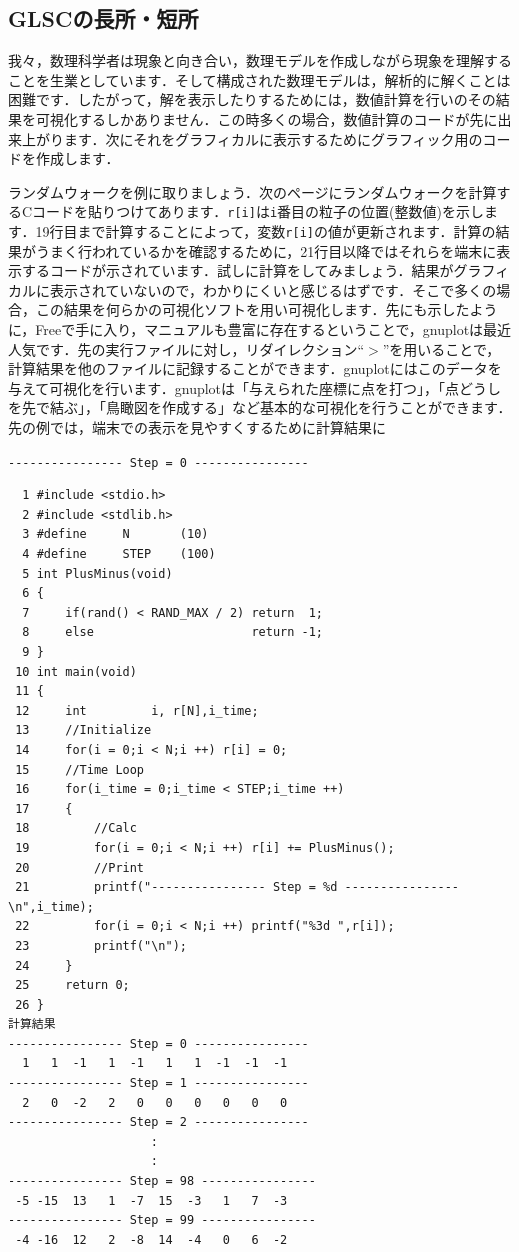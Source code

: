 \documentclass[platex,a4paper,12pt]{jsarticle}%
\begin{document}
\subsection{GLSCの長所・短所}

我々，数理科学者は現象と向き合い，数理モデルを作成しながら現象を理解することを生業としています．そして構成された数理モデルは，解析的に解くことは困難です．したがって，解を表示したりするためには，数値計算を行いのその結果を可視化するしかありません．この時多くの場合，数値計算のコードが先に出来上がります．次にそれをグラフィカルに表示するためにグラフィック用のコードを作成します．

ランダムウォークを例に取りましょう．次のページにランダムウォークを計算するCコードを貼りつけてあります．\verb|r[i]|は\verb|i|番目の粒子の位置(整数値)を示します．19行目まで計算することによって，変数\verb|r[i]|の値が更新されます．計算の結果がうまく行われているかを確認するために，21行目以降ではそれらを端末に表示するコードが示されています．試しに計算をしてみましょう．結果がグラフィカルに表示されていないので，わかりにくいと感じるはずです．そこで多くの場合，この結果を何らかの可視化ソフトを用い可視化します．先にも示したように，Freeで手に入り，マニュアルも豊富に存在するということで，gnuplotは最近人気です．先の実行ファイルに対し，リダイレクション``$>$''を用いることで，計算結果を他のファイルに記録することができます．gnuplotにはこのデータを与えて可視化を行います．gnuplotは「与えられた座標に点を打つ」，「点どうしを先で結ぶ」，「鳥瞰図を作成する」など基本的な可視化を行うことができます．先の例では，端末での表示を見やすくするために計算結果に

\verb|---------------- Step = 0 ----------------|

\newpage

\begin{verbatim}
  1 #include <stdio.h>
  2 #include <stdlib.h>
  3 #define     N       (10)
  4 #define     STEP    (100)
  5 int PlusMinus(void)
  6 {
  7     if(rand() < RAND_MAX / 2) return  1;
  8     else                      return -1;
  9 }
 10 int main(void)
 11 {
 12     int         i, r[N],i_time;
 13     //Initialize
 14     for(i = 0;i < N;i ++) r[i] = 0;
 15     //Time Loop
 16     for(i_time = 0;i_time < STEP;i_time ++)
 17     {
 18         //Calc
 19         for(i = 0;i < N;i ++) r[i] += PlusMinus();
 20         //Print
 21         printf("---------------- Step = %d ----------------\n",i_time);
 22         for(i = 0;i < N;i ++) printf("%3d ",r[i]);
 23         printf("\n");
 24     }
 25     return 0;
 26 }
計算結果
---------------- Step = 0 ----------------
  1   1  -1   1  -1   1   1  -1  -1  -1 
---------------- Step = 1 ----------------
  2   0  -2   2   0   0   0   0   0   0 
---------------- Step = 2 ----------------
　　　　　　　　　　　　:
　　　　　　　　　　　　:
---------------- Step = 98 ----------------
 -5 -15  13   1  -7  15  -3   1   7  -3 
---------------- Step = 99 ----------------
 -4 -16  12   2  -8  14  -4   0   6  -2 
\end{verbatim}
\end{document}

